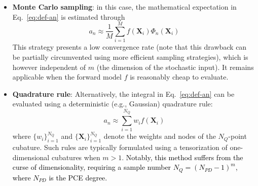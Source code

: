 \documentclass[preprint,review,12pt]{elsarticle}
\newcommand{\rev}[1]{\textcolor{black}{#1}}
\begin{document}
\begin{itemize}
    \item \textbf{Monte Carlo sampling}: in this case, the mathematical expectation in Eq.~\eqref{eq:def-an} is estimated through 
    \begin{equation}
        a_n \approx \frac{1}{M} \sum_{i = 1}^M f(\mathbf{X}_i) \Phi_n(\mathbf{X}_i)
    \end{equation}
    This strategy presents a low convergence rate (note that this drawback can be partially circumvented using more efficient sampling strategies), which is however independent of $m$ (the dimension of the stochastic input). It remains applicable when the forward model $f$ is reasonably cheap to evaluate. 
    

    \item \textbf{Quadrature rule}:
    Alternatively, the integral in Eq.~\eqref{eq:def-an} can be evaluated using a deterministic (e.g., Gaussian) quadrature rule:
    \begin{equation}
        a_n \approx \sum_{i=1}^{N_Q} w_i f(\mathbf{X}_i)
    \end{equation}
    where $\{w_i\}_{i = 1}^{N_Q}$ and $\{\mathbf{X}_i\}_{i = 1}^{N_Q}$ denote the weights and nodes of the $N_Q$-point cubature. Such rules are typically formulated using a tensorization of one-dimensional cubatures when $m >1$. \rev{Notably, this method suffers from the curse of dimensionality, requiring a sample number $N_Q=(N_{PD}-1)^m$, where $N_{PD}$ is the PCE degree.}   
    

\end{itemize}
\end{document}
